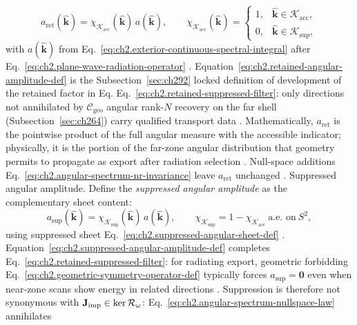 \begin{equation}
\label{eq:ch2.retained-angular-amplitude-def}
a_{\mathrm{ret}}(\widehat{\mathbf{k}})
=
\chi_{\mathcal{K}_{\mathrm{acc}}}(\widehat{\mathbf{k}})\,
a(\widehat{\mathbf{k}}),
\qquad
\chi_{\mathcal{K}_{\mathrm{acc}}}(\widehat{\mathbf{k}})
=
\begin{cases}
1, & \widehat{\mathbf{k}}\in\mathcal{K}_{\mathrm{acc}},\\
0, & \widehat{\mathbf{k}}\in\mathcal{K}_{\mathrm{sup}},
\end{cases}
\end{equation}
with \(a(\widehat{\mathbf{k}})\) from
Eq.~\eqref{eq:ch2.exterior-continuous-spectral-integral} after
Eq.~\eqref{eq:ch2.plane-wave-radiation-operator} \cite{stratton1941}.
Equation~\eqref{eq:ch2.retained-angular-amplitude-def} is the Subsection~\ref{sec:ch292} locked definition of
development of the retained factor in Eq.
Eq.~\eqref{eq:ch2.retained-suppressed-filter}: only directions not annihilated by
\(\mathcal{C}_{\mathrm{geo}}\) angular rank-$N$ recovery on the far shell (Subsection~\ref{sec:ch264}) carry
qualified transport data \cite{stratton1941}. Mathematically, \(a_{\mathrm{ret}}\) is the pointwise
product of the full angular measure with the accessible indicator; physically, it is the portion
of the far-zone angular distribution that geometry permits to propagate as export after radiation
selection \cite{harrington2001}. Null-space additions
Eq.~\eqref{eq:ch2.angular-spectrum-nr-invariance} leave \(a_{\mathrm{ret}}\) unchanged
\cite{stratton1941}. Suppressed angular amplitude. Define the \emph{suppressed angular amplitude} as the complementary sheet content:
\begin{equation}
\label{eq:ch2.suppressed-angular-amplitude-def}
a_{\mathrm{sup}}(\widehat{\mathbf{k}})
=
\chi_{\mathcal{K}_{\mathrm{sup}}}(\widehat{\mathbf{k}})\,
a(\widehat{\mathbf{k}}),
\qquad
\chi_{\mathcal{K}_{\mathrm{sup}}}=1-\chi_{\mathcal{K}_{\mathrm{acc}}}
\ \text{a.e.\ on}\ S^{2},
\end{equation}
using suppressed sheet Eq.~\eqref{eq:ch2.suppressed-angular-sheet-def}
\cite{stratton1941}. Equation~\eqref{eq:ch2.suppressed-angular-amplitude-def}
completes Eq.~\eqref{eq:ch2.retained-suppressed-filter}: for radiating export,
geometric forbidding Eq.~\eqref{eq:ch2.geometric-symmetry-operator-def} typically forces
\(a_{\mathrm{sup}}=\mathbf{0}\) even when near-zone scans show energy in related directions
\cite{stratton1941}. Suppression is therefore not synonymous with
\(\mathbf{J}_{\mathrm{imp}}\in\ker\mathcal{R}_\omega\): Eq.~\eqref{eq:ch2.angular-spectrum-nullspace-law} annihilates
